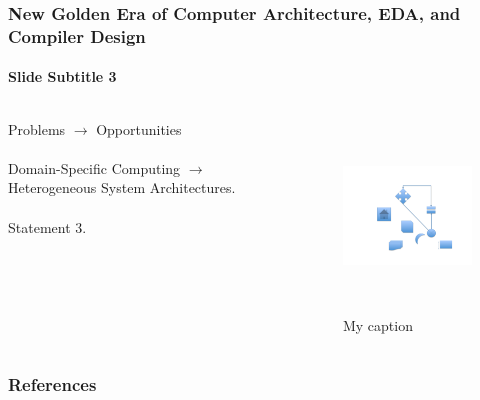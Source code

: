 \documentclass[xcolor={usenames,dvipsnames},hyperref={hyperindex,bookmarks}]{beamer}
\begin{document}
\begin{frame}
	\frametitle{New Golden Era of Computer Architecture, EDA, and Compiler Design}
	\framesubtitle{Slide Subtitle 3}
	
	\begin{columns}[t]			%
		\begin{column}[T]{5cm}	%
		
		Problems $\rightarrow$ Opportunities \\
		\ \\
		Domain-Specific Computing $\rightarrow$ Heterogeneous System Architectures. \\
		\ \\
		Statement 3.
		\end{column}
		
		\begin{column}[T]{5cm}	%
			\begin{figure}
			\centering
			\includegraphics[height=2in]{./pics/my_figure}
			\caption{My caption \cite{Petroski1992,Kopka2004}}
			\end{figure}
		\end{column}
	\end{columns}
\end{frame}






{\linespread{1}
\begin{frame}
	\frametitle{References}
	
	
\end{frame}
}
\end{document}
